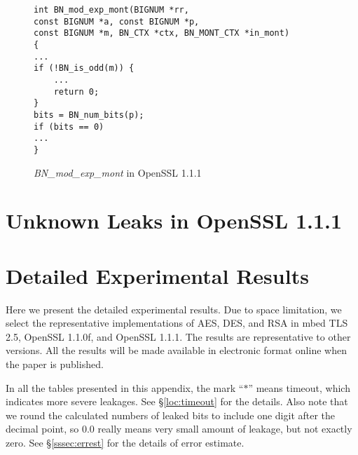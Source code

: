 \begin{figure}
    \centering
    \begin{lstlisting}[xleftmargin=.02\textwidth,xrightmargin=.01\textwidth]
int BN_mod_exp_mont(BIGNUM *rr, 
const BIGNUM *a, const BIGNUM *p,
const BIGNUM *m, BN_CTX *ctx, BN_MONT_CTX *in_mont)
{
...
if (!BN_is_odd(m)) {
    ...
    return 0;
}
bits = BN_num_bits(p);
if (bits == 0) 
...
}

\end{lstlisting}
    \vspace*{-6pt}
    \caption{\emph{BN\_mod\_exp\_mont} in OpenSSL 1.1.1}
    \label{fig:new_sqr2}
    \vspace*{-6pt}
\end{figure}

\section{Unknown Leaks in OpenSSL 1.1.1}

\section{Detailed Experimental Results}
\label{sec:result-table}

Here we present the detailed experimental results.
Due to space limitation, we select the representative implementations of
AES, DES, and RSA in
mbed TLS 2.5,
OpenSSL 1.1.0f,  and
OpenSSL 1.1.1.  
The results are representative to other versions.
All the results will be made available in electronic format online
when the paper is published. %

In all the tables presented in this appendix, the mark ``$*$'' means timeout,
which indicates more severe leakages. See \S\ref{loc:timeout} for the details.
Also note that we round the calculated numbers of leaked bits to include one digit
after the decimal point, so $0.0$ really means very small amount of leakage, but not exactly zero. See \S\ref{sssec:errest} for the details of error estimate.








